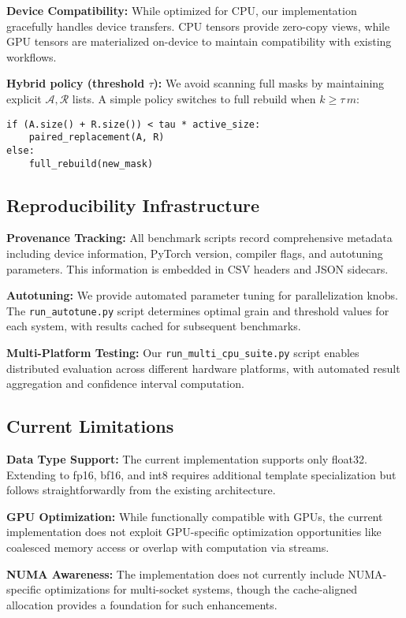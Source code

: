 \documentclass{article}
\numberwithin{equation}{section}
\theoremstyle{plain}
\theoremstyle{definition}
\theoremstyle{remark}
\begin{document}
\textbf{Device Compatibility:} While optimized for CPU, our implementation gracefully handles device transfers. CPU tensors provide zero-copy views, while GPU tensors are materialized on-device to maintain compatibility with existing workflows.

\textbf{Hybrid policy (threshold $\tau$):} We avoid scanning full masks by maintaining explicit $\mathcal{A},\mathcal{R}$ lists. A simple policy switches to full rebuild when $k \ge \tau\,m$:
\begin{verbatim}
if (A.size() + R.size()) < tau * active_size:
    paired_replacement(A, R)
else:
    full_rebuild(new_mask)
\end{verbatim}

\subsection{Reproducibility Infrastructure}

\textbf{Provenance Tracking:} All benchmark scripts record comprehensive metadata including device information, PyTorch version, compiler flags, and autotuning parameters. This information is embedded in CSV headers and JSON sidecars.

\textbf{Autotuning:} We provide automated parameter tuning for parallelization knobs. The \texttt{run\_autotune.py} script determines optimal grain and threshold values for each system, with results cached for subsequent benchmarks.

\textbf{Multi-Platform Testing:} Our \texttt{run\_multi\_cpu\_suite.py} script enables distributed evaluation across different hardware platforms, with automated result aggregation and confidence interval computation.

\subsection{Current Limitations}

\textbf{Data Type Support:} The current implementation supports only float32. Extending to fp16, bf16, and int8 requires additional template specialization but follows straightforwardly from the existing architecture.

\textbf{GPU Optimization:} While functionally compatible with GPUs, the current implementation does not exploit GPU-specific optimization opportunities like coalesced memory access or overlap with computation via streams.

\textbf{NUMA Awareness:} The implementation does not currently include NUMA-specific optimizations for multi-socket systems, though the cache-aligned allocation provides a foundation for such enhancements.
\end{document}
